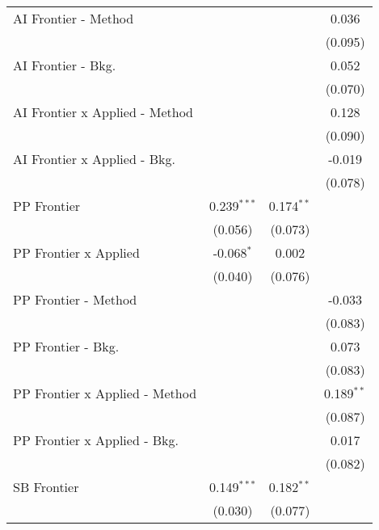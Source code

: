 \begin{tabular}{lccc}
   AI Frontier - Method           &               &               & 0.036\\   
                                  &               &               & (0.095)\\   
   AI Frontier - Bkg.             &               &               & 0.052\\   
                                  &               &               & (0.070)\\   
   AI Frontier x Applied - Method &               &               & 0.128\\   
                                  &               &               & (0.090)\\   
   AI Frontier x Applied - Bkg.   &               &               & -0.019\\   
                                  &               &               & (0.078)\\   
   PP Frontier                    & 0.239$^{***}$ & 0.174$^{**}$  &   \\   
                                  & (0.056)       & (0.073)       &   \\   
   PP Frontier x Applied          & -0.068$^{*}$  & 0.002         &   \\   
                                  & (0.040)       & (0.076)       &   \\   
   PP Frontier - Method           &               &               & -0.033\\   
                                  &               &               & (0.083)\\   
   PP Frontier - Bkg.             &               &               & 0.073\\   
                                  &               &               & (0.083)\\   
   PP Frontier x Applied - Method &               &               & 0.189$^{**}$\\   
                                  &               &               & (0.087)\\   
   PP Frontier x Applied - Bkg.   &               &               & 0.017\\   
                                  &               &               & (0.082)\\   
   SB Frontier                    & 0.149$^{***}$ & 0.182$^{**}$  &   \\   
                                  & (0.030)       & (0.077)       &   \\   

\end{tabular}
